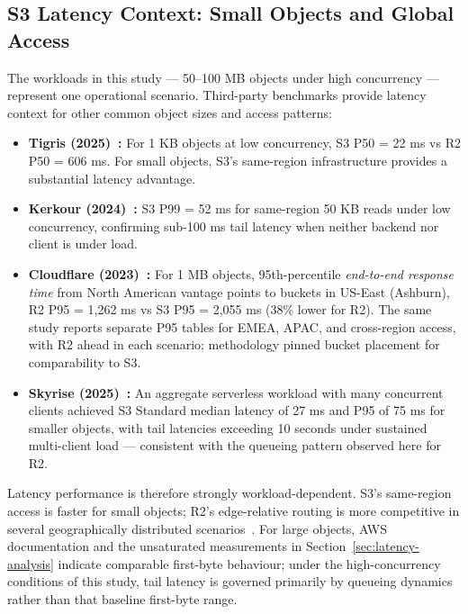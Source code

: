 \subsection{S3 Latency Context: Small Objects and Global Access}

The workloads in this study --- 50--100 MB objects under high concurrency --- represent one operational scenario. Third-party benchmarks provide latency context for other common object sizes and access patterns:

\begin{itemize}
    \item \textbf{Tigris (2025)~\cite{tigris-benchmark}:} For 1 KB objects at low concurrency, S3 P50 = 22 ms vs R2 P50 = 606 ms. For small objects, S3's same-region infrastructure provides a substantial latency advantage.
    \item \textbf{Kerkour (2024)~\cite{kerkour2024s3r2}:} S3 P99 = 52 ms for same-region 50 KB reads under low concurrency, confirming sub-100 ms tail latency when neither backend nor client is under load.
    \item \textbf{Cloudflare (2023)~\cite{cloudflare-r2-faster-s3}:} For 1 MB objects, 95th-percentile \emph{end-to-end response time} from North American vantage points to buckets in US-East (Ashburn), R2 P95 = 1,262 ms vs S3 P95 = 2,055 ms (38\% lower for R2). The same study reports separate P95 tables for EMEA, APAC, and cross-region access, with R2 ahead in each scenario; methodology pinned bucket placement for comparability to S3.
    \item \textbf{Skyrise (2025)~\cite{tu-berlin-skyrise}:} An aggregate serverless workload with many concurrent clients achieved S3 Standard median latency of 27 ms and P95 of 75 ms for smaller objects, with tail latencies exceeding 10 seconds under sustained multi-client load --- consistent with the queueing pattern observed here for R2.
\end{itemize}

Latency performance is therefore strongly workload-dependent. S3's same-region access is faster for small objects; R2's edge-relative routing is more competitive in several geographically distributed scenarios~\cite{cloudflare-r2-faster-s3}. For large objects, AWS documentation and the unsaturated measurements in Section~\ref{sec:latency-analysis} indicate comparable first-byte behaviour; under the high-concurrency conditions of this study, tail latency is governed primarily by queueing dynamics rather than that baseline first-byte range.

